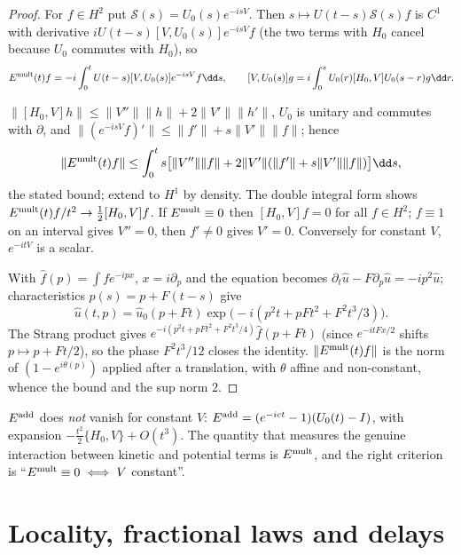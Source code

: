 \begin{proof}
For $f\in H^2$ put $\mathcal S(s)=U_0(s)e^{-isV}$. Then $s\mapsto U(t-s)\mathcal S(s)f$ is $C^1$ with derivative $iU(t-s)[V,U_0(s)]e^{-isV}f$ (the two terms with $H_0$ cancel because $U_0$ commutes with $H_0$), so
\[
E^{\rm mult}(t)f=-i\int_0^tU(t-s)[V,U_0(s)]e^{-isV}f\dd s,\qquad [V,U_0(s)]g=i\int_0^sU_0(r)[H_0,V]U_0(s-r)g\dd r .
\]

$\|[H_0,V]h\|\le\|V''\|\|h\|+2\|V'\|\|h'\|$, $U_0$ is unitary and commutes with $\partial$, and $\|(e^{-isV}f)'\|\le\|f'\|+s\|V'\|\|f\|$; hence
\[
\|E^{\rm mult}(t)f\|\le\int_0^ts\big[\|V''\|\|f\|+2\|V'\|(\|f'\|+s\|V'\|\|f\|)\big]\dd s,
\]
the stated bound; extend to $H^1$ by density. The double integral form shows $E^{\rm mult}(t)f/t^2\to\frac12[H_0,V]f$. If $E^{\rm mult}\equiv0$ then $[H_0,V]f=0$ for all $f\in H^2$; $f\equiv1$ on an interval gives $V''=0$, then $f'\ne0$ gives $V'=0$. Conversely for constant $V$, $e^{-itV}$ is a scalar.

With $\hat f(p)=\int fe^{-ipx}$, $x=i\partial_p$ and the equation becomes $\partial_t\hat u-F\partial_p\hat u=-ip^2\hat u$; characteristics $p(s)=p+F(t-s)$ give
\[
\hat u(t,p)=\hat u_0(p+Ft)\exp\!\big(-i(p^2t+pFt^2+F^2t^3/3)\big).
\]
The Strang product gives $e^{-i(p^2t+pFt^2+F^2t^3/4)}\hat f(p+Ft)$ (since $e^{-itFx/2}$ shifts $p\mapsto p+Ft/2$), so the phase $F^2t^3/12$ closes the identity. $\|E^{\rm mult}(t)f\|$ is the norm of $(1-e^{i\theta(p)})$ applied after a translation, with $\theta$ affine and non-constant, whence the bound and the sup norm $2$.

\end{proof}

\begin{caution}[title=A warning on $E^{\rm add}$]
$E^{\rm add}$ does \emph{not} vanish for constant $V$: $E^{\rm add}=(e^{-ict}-1)(U_0(t)-I)$, with expansion $-\frac{t^2}2\{H_0,V\}+O(t^3)$. The quantity that measures the genuine interaction between kinetic and potential terms is $E^{\rm mult}$, and the right criterion is ``$E^{\rm mult}\equiv0\iff V$ constant''.
\end{caution}

\section{Locality, fractional laws and delays}

